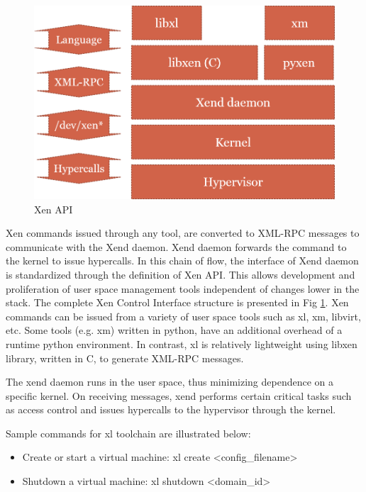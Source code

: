 \begin{figure}[H]
\centering
\includegraphics[scale=0.7]{figures/XEN_API.png}
\caption[Xen API]{Xen API \cite{chisnall_book}}
\label{fig:xen_api}
\end{figure}
Xen commands issued through any tool, are converted to XML-RPC messages to communicate with the Xend daemon. Xend daemon forwards the command to the kernel to issue hypercalls. In this chain of flow, the interface of Xend daemon is standardized through the definition of Xen API. This allows development and proliferation of user space management tools independent of changes lower in the stack. The complete Xen Control Interface structure is presented in Fig \ref{fig:xen_api}. Xen commands can be issued from a variety of user space tools such as xl, xm, libvirt, etc. Some tools (e.g. xm) written in python, have an additional overhead of a runtime python environment. In contrast, xl is relatively lightweight using libxen library, written in C, to generate XML-RPC messages.

The xend daemon runs in the user space, thus minimizing dependence on a specific kernel. On receiving messages, xend performs certain critical tasks such as access control and issues hypercalls to the hypervisor through the kernel.

Sample commands for xl toolchain are illustrated below:

\begin{itemize}
\item Create or start a virtual machine: xl create \textless config\_filename\textgreater

\item Shutdown a virtual machine: xl shutdown \textless domain\_id\textgreater
\end{itemize}


